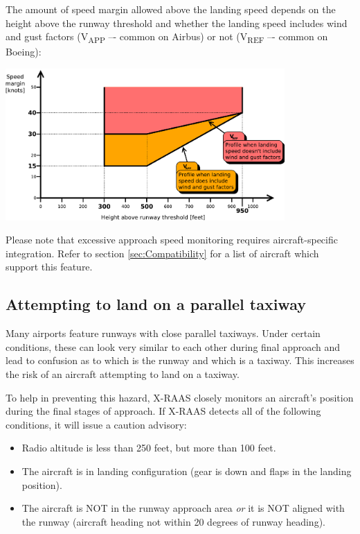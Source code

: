 \documentclass[a4paper,12pt]{article}
\begin{document}
\noindent The amount of speed margin allowed above the landing speed
depends on the height above the runway threshold and whether the landing
speed includes wind and gust factors (V\textsubscript{APP} –- common on
Airbus) or not (V\textsubscript{REF} –- common on Boeing):

\begin{center}
\includegraphics[width=0.8\textwidth]{../src/spd_table.pdf}
\end{center}

\noindent Please note that excessive approach speed monitoring requires
aircraft-specific integration. Refer to section
\ref{sec:Compatibility} for a list of aircraft which support
this feature.

\subsection{Attempting to land on a parallel taxiway}
\label{subsec:TwyLandingMon}

Many airports feature runways with close parallel taxiways. Under certain
conditions, these can look very similar to each other during final
approach and lead to confusion as to which is the runway and which is a
taxiway. This increases the risk of an aircraft attempting to land on a
taxiway.

To help in preventing this hazard, X-RAAS closely monitors an aircraft's
position during the final stages of approach. If X-RAAS detects all of
the following conditions, it will issue a caution advisory:

\begin{itemize}

\item Radio altitude is less than 250 feet, but more than 100 feet.

\item The aircraft is in landing configuration (gear is down and flaps in
the landing position).

\item The aircraft is NOT in the runway approach area \emph{or} it is NOT
aligned with the runway (aircraft heading not within 20 degrees of runway
heading).

\end{itemize}
\end{document}

